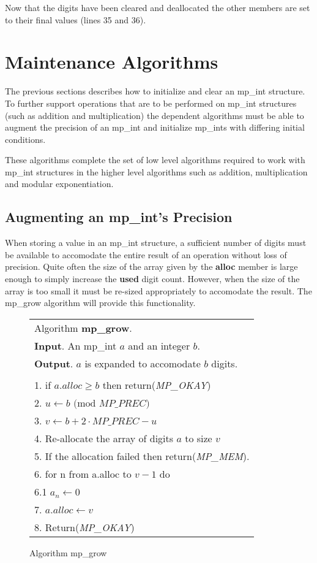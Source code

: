 \documentclass[b5paper]{book}
\begin{document}
Now that the digits have been cleared and deallocated the other members are set to their final values (lines 35 and 36).

\section{Maintenance Algorithms}

The previous sections describes how to initialize and clear an mp\_int structure.  To further support operations
that are to be performed on mp\_int structures (such as addition and multiplication) the dependent algorithms must be
able to augment the precision of an mp\_int and 
initialize mp\_ints with differing initial conditions.  

These algorithms complete the set of low level algorithms required to work with mp\_int structures in the higher level
algorithms such as addition, multiplication and modular exponentiation.

\subsection{Augmenting an mp\_int's Precision}
When storing a value in an mp\_int structure, a sufficient number of digits must be available to accomodate the entire 
result of an operation without loss of precision.  Quite often the size of the array given by the \textbf{alloc} member 
is large enough to simply increase the \textbf{used} digit count.  However, when the size of the array is too small it 
must be re-sized appropriately to accomodate the result.  The mp\_grow algorithm will provide this functionality.

\newpage\begin{figure}[here]
\begin{center}
\begin{tabular}{l}
\hline Algorithm \textbf{mp\_grow}. \\
\textbf{Input}.   An mp\_int $a$ and an integer $b$. \\
\textbf{Output}.  $a$ is expanded to accomodate $b$ digits. \\
\hline \\
1.  if $a.alloc \ge b$ then return(\textit{MP\_OKAY}) \\
2.  $u \leftarrow b\mbox{ (mod }MP\_PREC\mbox{)}$ \\
3.  $v \leftarrow b + 2 \cdot MP\_PREC - u$ \\
4.  Re-allocate the array of digits $a$ to size $v$ \\
5.  If the allocation failed then return(\textit{MP\_MEM}). \\
6.  for n from a.alloc to $v - 1$ do  \\
\hspace{+3mm}6.1  $a_n \leftarrow 0$ \\
7.  $a.alloc \leftarrow v$ \\
8.  Return(\textit{MP\_OKAY}) \\
\hline
\end{tabular}
\end{center}
\caption{Algorithm mp\_grow}
\end{figure}
\end{document}
